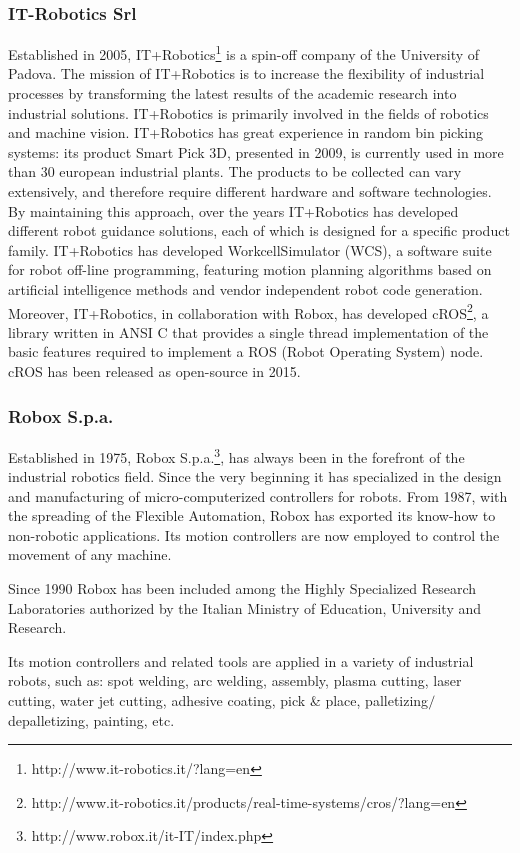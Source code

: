 \subsubsection{IT-Robotics Srl}
Established in 2005, IT+Robotics\footnote{http://www.it-robotics.it/?lang=en} is a spin-off company of the University of Padova. The mission of IT+Robotics is to increase the flexibility of industrial processes by transforming the latest results of the academic research into industrial solutions. IT+Robotics is primarily involved in the fields of robotics and machine vision. IT+Robotics has great experience in random bin picking systems: its product Smart Pick 3D, presented in 2009, is currently used in more than 30 european industrial plants. The products to be collected can vary extensively, and therefore require different hardware and software technologies. By maintaining this approach, over the years IT+Robotics has developed different robot guidance solutions, each of which is designed for a specific product family. IT+Robotics has developed WorkcellSimulator (WCS), a software suite for robot off-line programming, featuring motion planning algorithms based on artificial intelligence methods and vendor independent robot code generation. Moreover, IT+Robotics, in collaboration with Robox, has developed cROS\footnote{http://www.it-robotics.it/products/real-time-systems/cros/?lang=en}, a library written in ANSI C that provides a single thread implementation of the basic features required to implement a ROS (Robot Operating System) node. cROS has been released as open-source in 2015.

\subsubsection{Robox S.p.a.}
Established in 1975, Robox S.p.a.\footnote{http://www.robox.it/it-IT/index.php}, has always been in the forefront of the industrial robotics field. Since the very beginning it has specialized in the design and manufacturing of micro-computerized controllers for robots. From 1987, with the spreading of the Flexible Automation, Robox has exported its know-how to non-robotic applications. Its motion controllers are now employed to control the movement of any machine.

Since 1990 Robox has been included among the Highly Specialized Research Laboratories authorized by the Italian Ministry of Education, University and Research.

Its motion controllers and related tools are applied in a variety of industrial robots, such as: spot welding, arc welding, assembly, plasma cutting, laser cutting, water jet cutting, adhesive coating, pick \& place, palletizing$/$depalletizing, painting, etc. 

